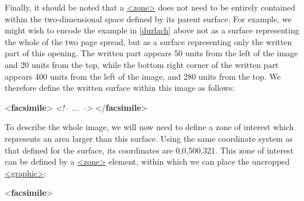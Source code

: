 Finally, it should be noted that a \hyperref[TEI.zone]{<zone>} does not need to be entirely contained within the two-dimensional space defined by its parent surface. For example, we might wish to encode the example in \ref{durlach} above not as a surface representing the whole of the two page spread, but as a surface representing only the written part of this opening. The written part appears 50 units from the left of the image and 20 units from the top, while the bottom right corner of the written part appears 400 units from the left of the image, and 280 units from the top. We therefore define the written surface within this image as follows: \par\bgroup{}\exampleFont \begin{shaded}\noindent\mbox{}{<\textbf{facsimile}>}\mbox{}\newline 
{}\mbox{}\newline 
\textit{<!-- ... -->}\mbox{}\newline 
{}\mbox{}\newline 
{</\textbf{facsimile}>}\end{shaded}\egroup\par \noindent  To describe the whole image, we will now need to define a zone of interest which represents an area larger than this surface. Using the same coordinate system as that defined for the surface, its coordinates are 0,0,500,321. This zone of interest can be defined by a \hyperref[TEI.zone]{<zone>} element, within which we can place the uncropped \hyperref[TEI.graphic]{<graphic>}: \par\bgroup{}\exampleFont \begin{shaded}\noindent\mbox{}{<\textbf{facsimile}>}\mbox{}\newline 

\end{shaded}

